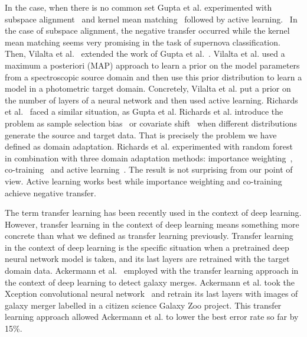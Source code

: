 In the case, when there is no common set Gupta et al. experimented with subspace alignment~\cite{fernando2014} and kernel mean matching~\cite{gretton2009} followed by active learning.~\cite{gupta2016}
In the case of subspace alignment, the negative transfer occurred while the kernel mean matching seems very promising in the task of supernova classification.
Then, Vilalta et al.~\cite{vilalta2018} extended the work of Gupta et al.~\cite{gupta2016}.
Vilalta et al. used a maximum a posteriori (MAP) approach to learn a prior on the model parameters from a spectroscopic source domain
and then use this prior distribution to learn a model in a photometric target domain.
Concretely, Vilalta et al. put a prior on the number of layers of a neural network
and then used active learning.
Richards et al.~\cite{richards2011} faced a similar situation, as Gupta et al.
Richards et al. introduce the problem as sample selection bias~\cite{shimodaira2000} or covariate shift~\cite{heckman1979}
when different distributions generate the source and target data.
That is precisely the problem we have defined as domain adaptation.
Richards et al. experimented with random forest in combination with three domain adaptation methods:
importance weighting~\cite{shimodaira2000}, co-training~\cite{blum1998} and active learning~\cite{settles2009}.
The result is not surprising from our point of view.
Active learning works best while importance weighting and co-training achieve negative transfer.

The term transfer learning has been recently used in the context of deep learning.
However, transfer learning in the context of deep learning means something more concrete than what we defined as transfer learning previously.
Transfer learning in the context of deep learning is the specific situation
when a pretrained deep neural network model is taken,
and its last layers are retrained with the target domain data.
Ackermann et al.~\cite{ackermann2018} employed with the transfer learning approach in the context of deep learning to detect galaxy merges.
Ackermann et al. took the Xception convolutional neural network~\cite{chollet2017}
and retrain its last layers with images of galaxy merger labelled in a citizen science Galaxy Zoo project.
This transfer learning approach allowed Ackermann et al. to lower the best error rate so far by 15\%.
